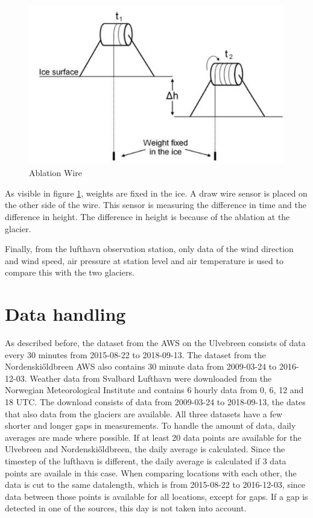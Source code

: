 \documentclass[11pt]{report}
\begin{document}
\begin{figure}[h]
\raggedright
\begin{minipage}{0.65\textwidth}
\raggedright
    \includegraphics[scale=1, width=1\textwidth]{abliationwire.jpg}	 
    \caption{Ablation Wire \cite{abl}}
    \label{fig:ablation}
\end{minipage}%
\end{figure}

As visible in figure \ref{fig:ablation}, weights are fixed in the ice. A draw wire sensor is placed on the other side of the wire. This sensor is measuring the difference in time and the difference in height. \cite{abl} The difference in height is because of the ablation at the glacier.

Finally, from the lufthavn observation station, only data of the wind direction and wind speed, air pressure at station level and air temperature is used to compare this with the two glaciers.

\section{Data handling}\label{sec:datah}

As described before, the dataset from the AWS on the Ulvebreen consists of data every 30 minutes from 2015-08-22 to 2018-09-13. The dataset from the Nordenski\H{o}ldbreen AWS also contains 30 minute data from 2009-03-24 to 2016-12-03. Weather data from Svalbard Lufthavn were downloaded from the Norwegian Meteorological Institute \cite{sharkii} and contains 6 hourly data from 0, 6, 12 and 18 UTC. The download consists of data from 2009-03-24 to 2018-09-13, the dates that also data from the glaciers are available. All three datasets have a few shorter and longer gaps in measurements. To handle the amount of data, daily averages are made where possible. If at least 20 data points are available for the Ulvebreen and Nordenski\H{o}ldbreen, the daily average is calculated. Since the timestep of the lufthavn is different, the daily average is calculated if 3 data points are availale in this case. When comparing locations with each other, the data is cut to the same datalength, which is from 2015-08-22 to 2016-12-03, since data between those points is available for all locations, except for gaps. If a gap is detected in one of the sources, this day is not taken into account. 
\end{document}
